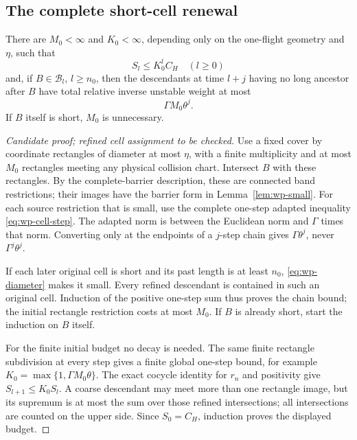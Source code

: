 \subsection{The complete short-cell renewal}

\begin{lemma}
\label{lem:wp-renewal}
There are $M_0<\infty$ and $K_0<\infty$, depending only on the
one-flight geometry and $\eta$, such that
\[
 S_l\le K_0^l C_H\quad(l\ge0)
\]
and, if $B\in\mathcal B_l$, $l\ge n_0$, then the descendants at time
$l+j$ having no long ancestor after $B$ have total relative inverse
unstable weight at most
\[
       \Gamma M_0\theta^j .
\]
If $B$ itself is short, $M_0$ is unnecessary.
\end{lemma}

\begin{proof}[Candidate proof; refined cell assignment to be checked]
Use a fixed cover by coordinate rectangles of diameter at most
$\eta$, with a finite multiplicity and at most $M_0$ rectangles
meeting any physical collision chart.
Intersect $B$ with these rectangles.
By the complete-barrier description, these are connected band
restrictions; their images have the barrier form in
Lemma~\ref{lem:wp-small}.
For each source restriction that is small, use the complete
one-step adapted inequality \eqref{eq:wp-cell-step}.
The adapted norm is between the Euclidean norm and $\Gamma$ times
that norm.  Converting only at the endpoints of a $j$-step chain
gives $\Gamma\theta^j$, never $\Gamma^j\theta^j$.

If each later original cell is short and its past length is at
least $n_0$, \eqref{eq:wp-diameter} makes it small.
Every refined descendant is contained in such an original cell.
Induction of the positive one-step sum thus proves the chain
bound; the initial rectangle restriction costs at most $M_0$.
If $B$ is already short, start the induction on $B$ itself.

For the finite initial budget no decay is needed.
The same finite rectangle subdivision at every step gives a
finite global one-step bound, for example
$K_0=\max\{1,\Gamma M_0\theta\}$.
The exact cocycle identity for $r_n$ and positivity give
$S_{l+1}\le K_0S_l$.
A coarse descendant may meet more than one rectangle image, but
its supremum is at most the sum over those refined intersections;
all intersections are counted on the upper side.
Since $S_0=C_H$, induction proves the displayed budget.
\end{proof}

